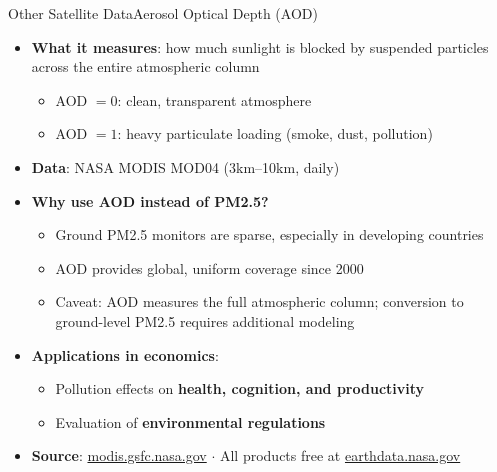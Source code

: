 \documentclass[dvipsnames,hyperref={pdfpagelabels=false}]{beamer}
\begin{document}
\begin{frame}{Other Satellite Data}{Aerosol Optical Depth (AOD)}
\begin{itemize}
    \item \textbf{What it measures}: how much sunlight is blocked 
    by suspended particles across the entire atmospheric column
    \vspace{0.2cm}
    \begin{itemize}
        \item AOD $= 0$: clean, transparent atmosphere
        \vspace{0.1cm}
        \item AOD $= 1$: heavy particulate loading (smoke, dust, pollution)
    \end{itemize}
    \vspace{0.2cm}
    \item \textbf{Data}: NASA MODIS MOD04 (3km--10km, daily)
    \vspace{0.2cm}
    \item \textbf{Why use AOD instead of PM2.5?}
    \vspace{0.1cm}
    \begin{itemize}
        \item Ground PM2.5 monitors are sparse, especially 
        in developing countries
        \vspace{0.1cm}
        \item AOD provides global, uniform coverage since 2000
        \vspace{0.1cm}
        \item Caveat: AOD measures the full atmospheric column; 
        conversion to ground-level PM2.5 requires additional modeling
    \end{itemize}
    \vspace{0.2cm}
    \item \textbf{Applications in economics}:
    \vspace{0.1cm}
    \begin{itemize}
        \item Pollution effects on \textbf{health, cognition, and productivity}
        \vspace{0.1cm}
        \item Evaluation of \textbf{environmental regulations}
    \end{itemize}
    \vspace{0.1cm}
    \item \textbf{Source}: 
    \href{https://modis.gsfc.nasa.gov/data/dataprod/}{modis.gsfc.nasa.gov} 
    $\cdot$ All products free at 
    \href{https://earthdata.nasa.gov}{earthdata.nasa.gov}
\end{itemize}
\end{frame}
\end{document}
